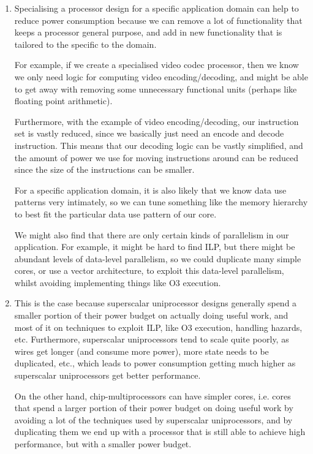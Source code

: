 


\begin{enumerate}[label=(\alph*)]
  \item
    Specialising a processor design for a specific application domain can help to reduce power consumption because we can remove a lot of functionality that keeps a processor general purpose, and add in new functionality that is tailored to the specific to the domain.

    For example, if we create a specialised video codec processor, then we know we only need logic for computing video encoding/decoding, and might be able to get away with removing some unnecessary functional units (perhaps like floating point arithmetic).
    
    Furthermore, with the example of video encoding/decoding, our instruction set is vastly reduced, since we basically just need an encode and decode instruction. This means that our decoding logic can be vastly simplified, and the amount of power we use for moving instructions around can be reduced since the size of the instructions can be smaller.

    For a specific application domain, it is also likely that we know data use patterns very intimately, so we can tune something like the memory hierarchy to best fit the particular data use pattern of our core.

    We might also find that there are only certain kinds of parallelism in our application. For example, it might be hard to find ILP, but there might be abundant levels of data-level parallelism, so we could duplicate many simple cores, or use a vector architecture, to exploit this data-level parallelism, whilst avoiding implementing things like O3 execution.

  \item
    This is the case because superscalar uniprocessor designs generally spend a smaller portion of their power budget on actually doing useful work, and most of it on techniques to exploit ILP, like O3 execution, handling hazards, etc. Furthermore, superscalar uniprocessors tend to scale quite poorly, as wires get longer (and consume more power), more state needs to be duplicated, etc., which leads to power consumption getting much higher as superscalar uniprocessors get better performance.

    On the other hand, chip-multiprocessors can have simpler cores, i.e. cores that spend a larger portion of their power budget on doing useful work by avoiding a lot of the techniques used by superscalar uniprocessors, and by duplicating them we end up with a processor that is still able to achieve high performance, but with a smaller power budget.


\end{enumerate}
